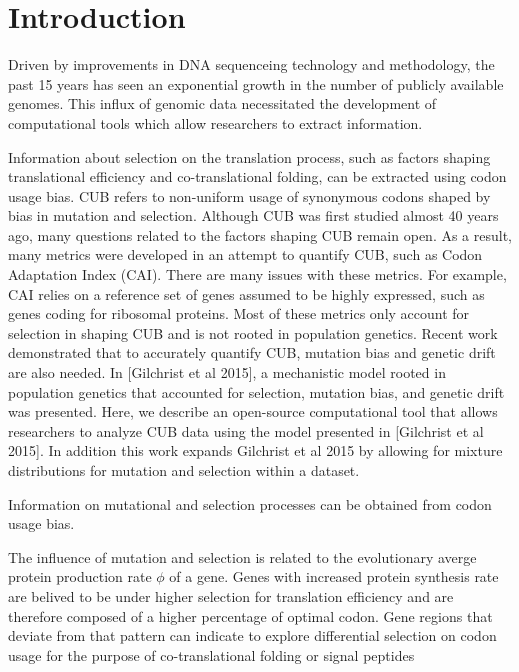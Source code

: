 \documentclass{bioinfo}
\begin{document}
\section*{Introduction}
Driven by improvements in DNA sequenceing technology and methodology, the past 15 years has seen an exponential growth in the number of publicly available genomes. 
This influx of genomic data necessitated the development of computational tools which allow researchers to extract information.

Information about selection on the translation process, such as factors shaping translational efficiency and co-translational folding, can be extracted using codon usage bias.
CUB refers to non-uniform usage of synonymous codons shaped by bias in mutation and selection.
Although CUB was first studied almost 40 years ago, many questions related to the factors shaping CUB remain open.
As a result, many metrics were developed in an attempt to quantify CUB, such as Codon Adaptation Index (CAI).
There are many issues with these metrics.
For example, CAI relies on a reference set of genes assumed to be highly expressed, such as genes coding for ribosomal proteins.
Most of these metrics only account for selection in shaping CUB and is not rooted in population genetics. 
Recent work demonstrated that to accurately quantify CUB, mutation bias and genetic drift are also needed.
In [Gilchrist et al 2015], a mechanistic model rooted in population genetics that accounted for selection, mutation bias, and genetic drift was presented. 
Here, we describe an open-source computational tool that allows researchers to analyze CUB data using the model presented in [Gilchrist et al 2015].
In addition this work expands Gilchrist et al 2015 by allowing for mixture distributions for mutation and selection within a dataset.

Information on mutational and selection processes can be obtained from codon usage bias.
 
The influence of mutation and selection is related to the evolutionary averge protein production rate $\phi$ of a gene.
Genes with increased protein synthesis rate are belived to be under higher selection for translation efficiency and are therefore composed of a higher percentage of optimal codon.
Gene regions that deviate from that pattern can indicate to explore differential selection on codon usage for the purpose of co-translational folding or signal peptides
\end{document}
